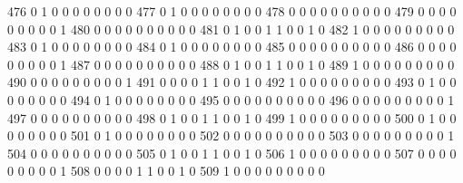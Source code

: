 \documentclass[compress,8pt]{beamer}
\begin{document}
\begin{frame}
\begin{Schunk}
  476      0       1   0              0        0    0       0       0   0   0
  477      0       1   0              0        0    0       0       0   0   0
  478      0       0   0              0        0    0       0       0   0   0
  479      0       0   0              0        0    0       0       0   0   1
  480      0       0   0              0        0    0       0       0   0   0
  481      0       1   0              0        1    1       0       0   1   0
  482      1       0   0              0        0    0       0       0   0   0
  483      0       1   0              0        0    0       0       0   0   0
  484      0       1   0              0        0    0       0       0   0   0
  485      0       0   0              0        0    0       0       0   0   0
  486      0       0   0              0        0    0       0       0   0   1
  487      0       0   0              0        0    0       0       0   0   0
  488      0       1   0              0        1    1       0       0   1   0
  489      1       0   0              0        0    0       0       0   0   0
  490      0       0   0              0        0    0       0       0   0   1
  491      0       0   0              0        1    1       0       0   1   0
  492      1       0   0              0        0    0       0       0   0   0
  493      0       1   0              0        0    0       0       0   0   0
  494      0       1   0              0        0    0       0       0   0   0
  495      0       0   0              0        0    0       0       0   0   0
  496      0       0   0              0        0    0       0       0   0   1
  497      0       0   0              0        0    0       0       0   0   0
  498      0       1   0              0        1    1       0       0   1   0
  499      1       0   0              0        0    0       0       0   0   0
  500      0       1   0              0        0    0       0       0   0   0
  501      0       1   0              0        0    0       0       0   0   0
  502      0       0   0              0        0    0       0       0   0   0
  503      0       0   0              0        0    0       0       0   0   1
  504      0       0   0              0        0    0       0       0   0   0
  505      0       1   0              0        1    1       0       0   1   0
  506      1       0   0              0        0    0       0       0   0   0
  507      0       0   0              0        0    0       0       0   0   1
  508      0       0   0              0        1    1       0       0   1   0
  509      1       0   0              0        0    0       0       0   0   0

\end{Schunk}
\end{frame}
\end{document}
